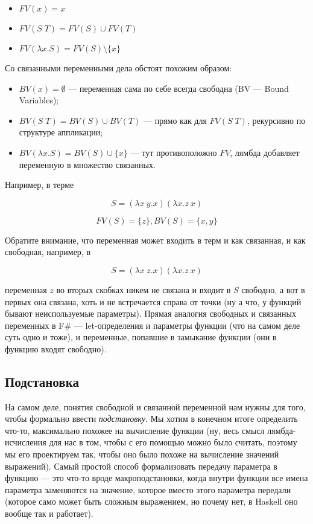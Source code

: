 \documentclass{../../text-style}
\begin{document}
\begin{itemize}
    \item $FV(x) = x$
    \item $FV(S \; T) = FV(S) \cup FV(T)$
    \item $FV(\lambda x.S) = FV(S) \setminus \{x\}$
\end{itemize}

Со связанными переменными дела обстоят похожим образом:

\begin{itemize}
    \item $BV(x) = \emptyset$ --- переменная сама по себе всегда свободна (BV --- Bound Variables);
    \item $BV(S \; T) = BV(S) \cup BV(T)$ --- прямо как для $FV(S \; T)$, рекурсивно по структуре аппликации;
    \item $BV(\lambda x.S) = BV(S) \cup \{x\}$ --- тут противоположно $FV$, лямбда добавляет переменную в множество связанных.
\end{itemize}

Например, в терме

$$S = (\lambda x\ y.x) (\lambda x.z\ x)$$

$$FV(S) = \{z\}, BV(S) = \{x,y\}$$

Обратите внимание, что переменная может входить в терм и как связанная, и как свободная, например, в

$$S = (\lambda x\ z.x) (\lambda x.z\ x)$$

переменная $z$ во вторых скобках никем не связана и входит в $S$ свободно, а вот в первых она связана, хоть и не встречается справа от точки (ну а что, у функций бывают неиспользуемые параметры). Прямая аналогия свободных и связанных переменных в F\# --- let-определения и  параметры функции (что на самом деле суть одно и тоже), и переменные, попавшие в замыкание функции (они в функцию входят свободно).

\subsection{Подстановка}

На самом деле, понятия свободной и связанной переменной нам нужны для того, чтобы формально ввести \textit{подстановку}. Мы хотим в конечном итоге определить что-то, максимально похожее на вычисление функции (ну, весь смысл лямбда-исчисления для нас в том, чтобы с его помощью можно было считать, поэтому мы его проектируем так, чтобы оно было похоже на вычисление значений выражений). Самый простой способ формализовать передачу параметра в функцию --- это что-то вроде макроподстановки, когда внутри функции все имена параметра заменяются на значение, которое вместо этого параметра передали (которое само может быть сложным выражением, но почему нет, в Haskell оно вообще так и работает).
\end{document}
